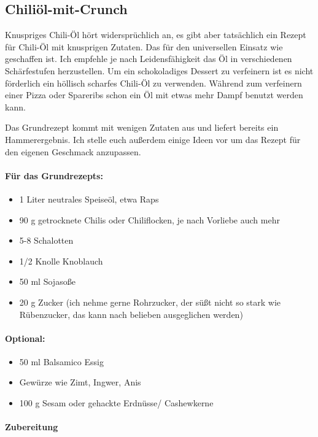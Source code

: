 \subsection{Chiliöl-mit-Crunch}
{Knuspriges Chili-Öl}
hört widersprüchlich an,  es gibt aber tatsächlich ein Rezept für Chili-Öl mit 
knusprigen Zutaten. Das für den universellen Einsatz wie geschaffen ist. Ich 
empfehle je nach Leidensfähigkeit das Öl in verschiedenen Schärfestufen 
herzustellen. Um ein schokoladiges Dessert zu verfeinern ist es nicht förderlich 
ein höllisch scharfes Chili-Öl zu verwenden. Während zum verfeinern einer 
Pizza oder Spareribs schon ein Öl mit etwas mehr Dampf benutzt werden kann.

Das Grundrezept kommt mit wenigen Zutaten aus und liefert bereits ein 
Hammerergebnis.
Ich stelle euch außerdem einige Ideen vor um das Rezept für den eigenen 
Geschmack anzupassen.
\newline

\paragraph{Für das Grundrezepts:}

\begin{itemize}[noitemsep]
	\item 1 Liter neutrales Speiseöl, etwa Raps
	\item 90 g getrocknete Chilis oder Chiliflocken,  je nach Vorliebe auch mehr
	\item 5-8 Schalotten
	\item 1/2 Knolle Knoblauch
	\item 50 ml Sojasoße
	\item 20 g Zucker (ich nehme gerne Rohrzucker, der süßt nicht so stark wie 
	Rübenzucker, das kann nach belieben ausgeglichen werden) 
\end{itemize}

\paragraph{Optional:}

\begin{itemize}[noitemsep]
	\item 50 ml Balsamico Essig
	\item Gewürze wie Zimt,  Ingwer,  Anis
	\item 100 g Sesam oder gehackte Erdnüsse/ Cashewkerne
\end{itemize}

\paragraph{Zubereitung}

